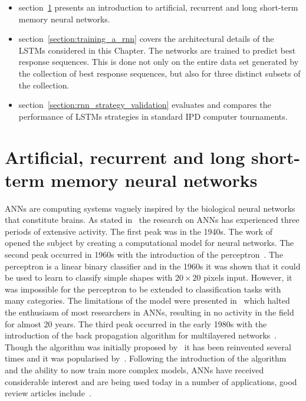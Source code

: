 \begin{itemize}
    \item section~\ref{section:artificial_neural_networks} presents an
    introduction to artificial, recurrent and long short-term memory neural networks.
    \item section~\ref{section:training_a_rnn} covers the architectural details
    of the LSTMs considered in this Chapter. The networks are trained to predict
    best response sequences. This is done not only on the entire data set
    generated by the collection of best response sequences, but also for three
    distinct subsets of the collection.
    \item section~\ref{section:rnn_strategy_validation} evaluates and compares
    the performance of \lstmstrategies LSTMs strategies in
    \metatournamentslstm standard IPD computer tournaments.
\end{itemize}

\section{Artificial, recurrent and long short-term memory neural networks}\label{section:artificial_neural_networks}

ANNs are computing systems vaguely inspired by the biological neural networks
that constitute brains. As stated in~\cite{Jain1996} the research on ANNs
has experienced three periods of extensive activity. The first peak was in the
1940s. The work of~\cite{McCulloch1943} opened the subject by creating a
computational model for neural networks. The second peak occurred in 1960s with
the introduction of the perceptron~\cite{Rosenblatt1958}. The perceptron is a
linear binary classifier and in the 1960s it was shown that it could be used to
learn to classify simple shapes with \(20\times20\) pixels input. However, it
was impossible for the perceptron to be extended to classification tasks with
many categories. The limitations of the model were presented
in~\cite{Minsky1969} which halted the enthusiasm of most researchers in ANNs,
resulting in no activity in the field for almost 20 years. The third peak occurred
in the early 1980s with the introduction of the back propagation algorithm for
multilayered networks~\cite{Werbos1974}. Though the algorithm was initially
proposed by~\cite{Werbos1974} it has been reinvented several times and it was
popularised by~\cite{McClelland1986}. Following the introduction of the
algorithm and the ability to now train more complex models, ANNs have received
considerable interest and are being used today in a number of applications,
good review articles include~\cite{Abiodun2019, Li2010, Mohanraj2015, Shahid2019}.

